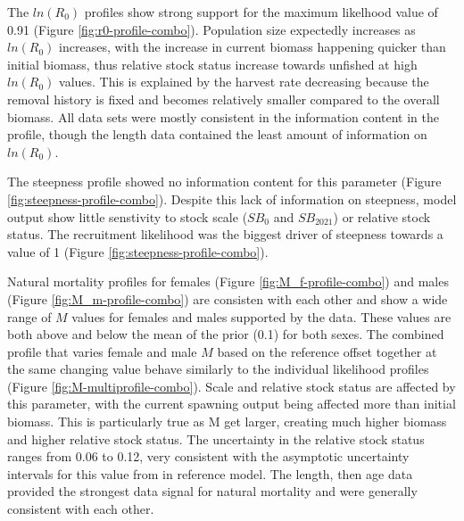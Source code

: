 \documentclass[11pt,
  english,
  a4paper,
]{article}
\begin{document}
The {\(ln(R_0)\)\leavevmode\tagmcend\tagstructend} profiles show strong support for the maximum likelhood value of 0.91 (Figure \ref{fig:r0-profile-combo}). Population size expectedly increases as {\(ln(R_0)\)\leavevmode\tagmcend\tagstructend} increases, with the increase in current biomass happening quicker than initial biomass, thus relative stock status increase towards unfished at high {\(ln(R_0)\)\leavevmode\tagmcend\tagstructend} values. This is explained by the harvest rate decreasing because the removal history is fixed and becomes relatively smaller compared to the overall biomass. All data sets were mostly consistent in the information content in the profile, though the length data contained the least amount of information on {\(ln(R_0)\)\leavevmode\tagmcend\tagstructend}.

\leavevmode\tagmcend\tagstructend\par


The steepness profile showed no information content for this parameter (Figure \ref{fig:steepness-profile-combo}). Despite this lack of information on steepness, model output show little senstivity to stock scale ({\(SB_0\)\leavevmode\tagmcend\tagstructend} and {\(SB_2021\)\leavevmode\tagmcend\tagstructend}) or relative stock status. The recruitment likelihood was the biggest driver of steepness towards a value of 1 (Figure \ref{fig:steepness-profile-combo}).

\leavevmode\tagmcend\tagstructend\par


Natural mortality profiles for females (Figure \ref{fig:M_f-profile-combo}) and males (Figure \ref{fig:M_m-profile-combo}) are consisten with each other and show a wide range of {\(M\)\leavevmode\tagmcend\tagstructend} values for females and males supported by the data. These values are both above and below the mean of the prior (0.1) for both sexes. The combined profile that varies female and male {\(M\)\leavevmode\tagmcend\tagstructend} based on the reference offset together at the same changing value behave similarly to the individual likelihood profiles (Figure \ref{fig:M-multiprofile-combo}). Scale and relative stock status are affected by this parameter, with the current spawning output being affected more than initial biomass. This is particularly true as M get larger, creating much higher biomass and higher relative stock status. The uncertainty in the relative stock status ranges from 0.06 to 0.12, very consistent with the asymptotic uncertainty intervals for this value from in reference model. The length, then age data provided the strongest data signal for natural mortality and were generally consistent with each other.
\end{document}
